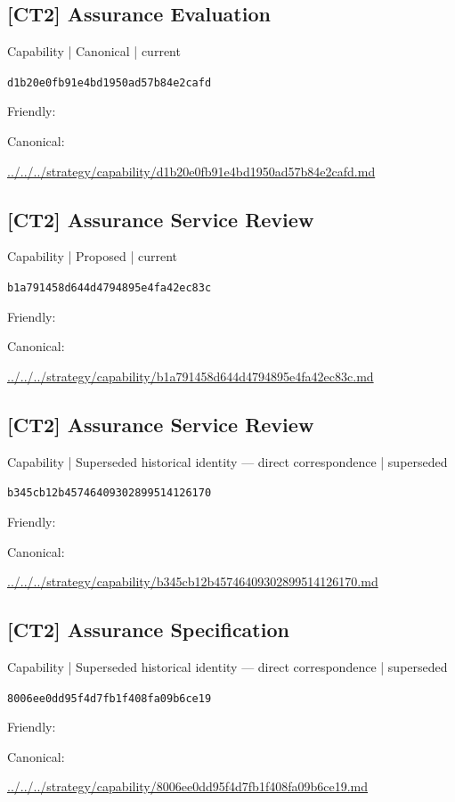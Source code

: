 \documentclass[10pt,a4paper]{article}
\begin{document}
\subsection*{[CT2] Assurance Evaluation}
{\small Capability | Canonical | current}\par
\texttt{d1b20e0fb91e4bd1950ad57b84e2cafd}\par
Friendly: \par
Canonical: \par
{\footnotesize\url{../../../strategy/capability/d1b20e0fb91e4bd1950ad57b84e2cafd.md}}\par
\subsection*{[CT2] Assurance Service Review}
{\small Capability | Proposed | current}\par
\texttt{b1a791458d644d4794895e4fa42ec83c}\par
Friendly: \par
Canonical: \par
{\footnotesize\url{../../../strategy/capability/b1a791458d644d4794895e4fa42ec83c.md}}\par
\subsection*{[CT2] Assurance Service Review}
{\small Capability | Superseded historical identity — direct correspondence | superseded}\par
\texttt{b345cb12b45746409302899514126170}\par
Friendly: \par
Canonical: \par
{\footnotesize\url{../../../strategy/capability/b345cb12b45746409302899514126170.md}}\par
\subsection*{[CT2] Assurance Specification}
{\small Capability | Superseded historical identity — direct correspondence | superseded}\par
\texttt{8006ee0dd95f4d7fb1f408fa09b6ce19}\par
Friendly: \par
Canonical: \par
{\footnotesize\url{../../../strategy/capability/8006ee0dd95f4d7fb1f408fa09b6ce19.md}}\par
\end{document}
